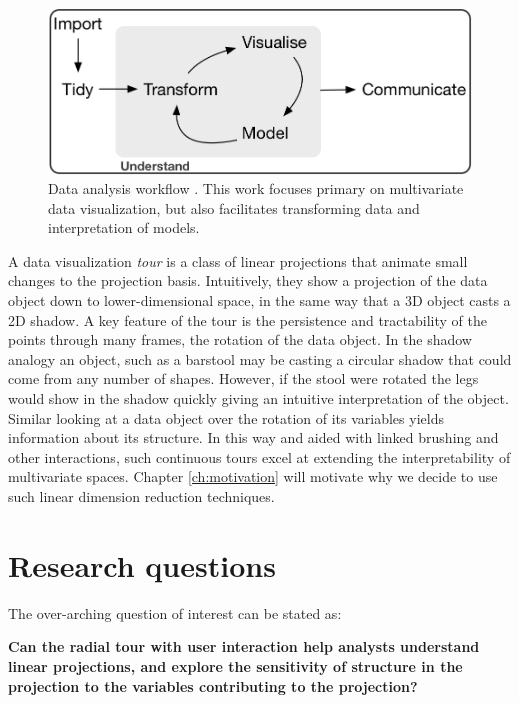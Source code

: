 \documentclass{template/monashthesis}
\begin{document}
\begin{figure}

{\centering \includegraphics[width=1\linewidth,]{./figures/data_analysis_workflow} 

}

\caption{Data analysis workflow \autocite{wickham_r_2017}. This work focuses primary on multivariate data visualization, but also facilitates transforming data and interpretation of models.}\label{fig:dataanalysisworkflow}
\end{figure}

A data visualization \emph{tour} \autocite{cook_grand_2008,lee_review_2021} is a class of linear projections that animate small changes to the projection basis. Intuitively, they show a projection of the data object down to lower-dimensional space, in the same way that a 3D object casts a 2D shadow. A key feature of the tour is the persistence and tractability of the points through many frames, the rotation of the data object. In the shadow analogy an object, such as a barstool may be casting a circular shadow that could come from any number of shapes. However, if the stool were rotated the legs would show in the shadow quickly giving an intuitive interpretation of the object. Similar looking at a data object over the rotation of its variables yields information about its structure. In this way and aided with linked brushing and other interactions, such continuous tours excel at extending the interpretability of multivariate spaces. Chapter \ref{ch:motivation} will motivate why we decide to use such linear dimension reduction techniques.

\hypertarget{research-questions}{%
\section{Research questions}\label{research-questions}}

The over-arching question of interest can be stated as:

\textbf{Can the radial tour with user interaction help analysts understand linear projections, and explore the sensitivity of structure in the projection to the variables contributing to the projection?}
\end{document}
